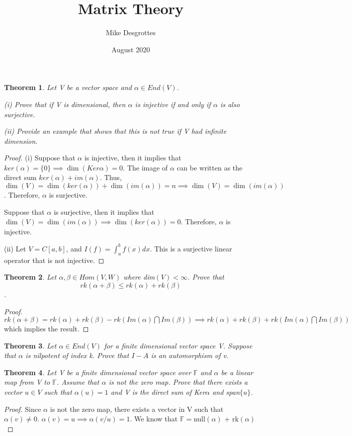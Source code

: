 \documentclass{article}
\title{Matrix Theory}
\author{Mike Desgrottes}
\date{August 2020}
\theoremstyle{plain}
\newtheorem{theorem}{Theorem}
\theoremstyle{definition}
\begin{document}
\maketitle

\section{}
\begin{theorem}
Let V be a vector space and $\alpha \in End(V)$.

(i) Prove that if V is dimensional, then $\alpha$ is injective if and only if $\alpha$ is also surjective.

(ii) Provide an example that shows that this is not true if V had infinite dimension.
\end{theorem}

\begin{proof}
(i) Suppose that $\alpha$ is injective, then it implies that $ker(\alpha) = \{0\} \implies \dim (Ker \alpha) = 0$. The image of $\alpha$ can be written as the direct sum $ker(\alpha) + im(\alpha)$. Thus, $\dim(V) = \dim(ker(\alpha)) + \dim(im(\alpha)) = n \implies \dim(V) = \dim(im(\alpha))$. Therefore, $\alpha$ is surjective. 

Suppose that $\alpha$ is surjective, then it implies that $\dim(V) = \dim(im(\alpha)) \implies \dim(ker(\alpha)) = 0$. Therefore, $\alpha$ is injective. 


	(ii) Let $V =C[a,b]$, and $I(f) = \int_{a}^{b} f(x) dx$. This is a surjective linear operator that is not injective.  
\end{proof}

\begin{theorem}
	Let $\alpha, \beta \in Hom(V,W)$ where dim$(V) < \infty$. Prove that $$rk( \alpha + \beta) \leq rk(\alpha) + rk(\beta) $$.
\end{theorem}

\begin{proof}
	$rk(\alpha + \beta) = rk(\alpha) + rk(\beta) - rk(Im(\alpha) \bigcap Im(\beta)) \implies rk(\alpha) + rk(\beta) + rk(Im(\alpha) \bigcap Im(\beta))$ which implies the result.
\end{proof}

\begin{theorem}
	Let $\alpha \in End(V)$ for a finite dimensional vector space V. Suppose that $\alpha$ is nilpotent of index k. Prove that $I - A$ is an automorphism of v. 
\end{theorem}

\begin{theorem}
	Let V be a finite dimensional vector space over $\mathbb{F}$ and $\alpha$ be a linear map from V to $\mathbb{F}$. Assume that $\alpha$ is not the zero map. Prove that there exists a vector $u \in V$ such that $\alpha(u) = 1$ and V is the direct sum of Ker$\alpha$ and span$\{u\}$.
\end{theorem}

\begin{proof}
	Since $\alpha$ is not the zero map, there exists a vector in V such that $\alpha(v) \not = 0$. $\alpha(v) = u \implies \alpha(v/u) = 1$. We know that $\mathbb{F} = $null$(\alpha)$ + rk$(\alpha)$
\end{proof}
\end{document}
